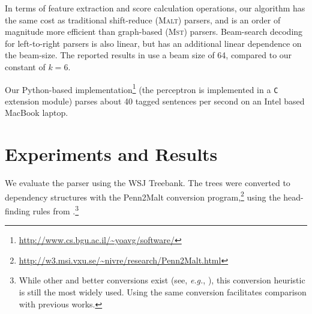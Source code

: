 \documentclass[11pt]{article}
\begin{document}


In terms of feature extraction and score calculation operations, our algorithm has the same cost as traditional shift-reduce (\textsc{Malt}) parsers, and is an order of magnitude more efficient than graph-based (\textsc{Mst}) parsers.  Beam-search decoding for left-to-right parsers \cite{tale-two-parsers} is also linear, but has an additional linear dependence on the beam-size.  The reported results in \cite{tale-two-parsers} use a beam size of 64, compared to our constant of $k=6$.

Our Python-based implementation\footnote{\url{http://www.cs.bgu.ac.il/~yoavg/software/}} (the perceptron is implemented in a \texttt{C} extension module) parses about 40 tagged sentences per second on an Intel based MacBook laptop.  

\section{Experiments and Results}
\vspace{-5pt}

We evaluate the parser using the WSJ Treebank.  The trees were converted to dependency structures with the Penn2Malt conversion program,\footnote{\url{http://w3.msi.vxu.se/~nivre/research/Penn2Malt.html}} using the head-finding rules from \cite{yamada-matsumoto}.\footnote{While other and better conversions exist (see, {\em e.g.}, \cite{pennconverter,TDS}), this conversion heuristic is still the most widely used.  Using the same conversion facilitates comparison with previous works.}%
\end{document}
